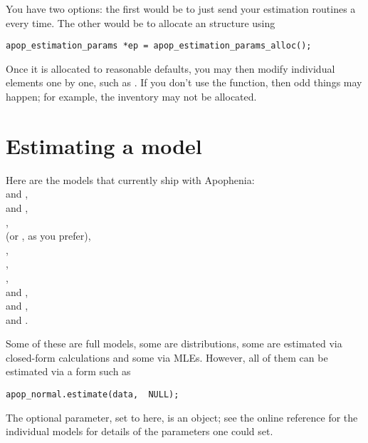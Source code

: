 You have two options: the first would be to just send your estimation
routines a  every time. The other would be to allocate an
 structure using 
\begin{lstlisting}
apop_estimation_params *ep = apop_estimation_params_alloc();
\end{lstlisting}
Once it is allocated to reasonable defaults, you may then modify
individual elements one by one, such as .
If you don't use the  function,
then odd things may happen; for example, the inventory may not be
allocated.

\section{Estimating a model}
 
 
 
 
 
Here are the models that currently ship with Apophenia:\\
 and , \\
 and , \\
, \\
 (or , as you prefer), \\
, \\
, \\
, \\
 and , \\
 and , \\
 and .

Some of these are full models, some are distributions, some are
estimated via closed-form calculations and some via MLEs. However, all
of them can be estimated via a form such as
\begin{lstlisting}
apop_normal.estimate(data,  NULL);
\end{lstlisting}

The optional parameter, set to  here,
is an  object; see
the online reference for the individual models for details of the
parameters one could set.

